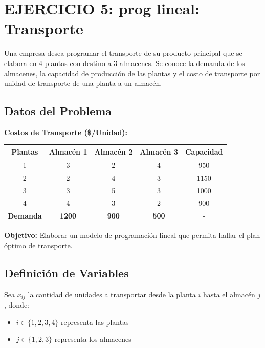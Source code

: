 \documentclass[12pt, a4paper, oneside]{book}
\theoremstyle{definition}
\begin{document}
    \newpage
    \section{EJERCICIO 5: prog lineal: Transporte}

    Una empresa desea programar el transporte de su producto principal que se elabora en 4 plantas con destino a 3 almacenes. Se conoce la demanda de los almacenes, la capacidad de producción de las plantas y el costo de transporte por unidad de transporte de una planta a un almacén.

    \subsection{Datos del Problema}

    \textbf{Costos de Transporte (\$/Unidad):}

    \begin{center}
    \begin{tabular}{|c|c|c|c|c|}
    \hline
    \textbf{Plantas} & \textbf{Almacén 1} & \textbf{Almacén 2} & \textbf{Almacén 3} & \textbf{Capacidad} \\
    \hline
    1 & 3 & 2 & 4 & 950 \\
    \hline
    2 & 2 & 4 & 3 & 1150 \\
    \hline
    3 & 3 & 5 & 3 & 1000 \\
    \hline
    4 & 4 & 3 & 2 & 900 \\
    \hline
    \textbf{Demanda} & \textbf{1200} & \textbf{900} & \textbf{500} & - \\
    \hline
    \end{tabular}
    \end{center}

    \textbf{Objetivo:} Elaborar un modelo de programación lineal que permita hallar el plan óptimo de transporte.

    \subsection{Definición de Variables}

    Sea $x_{ij}$ la cantidad de unidades a transportar desde la planta $i$ hasta el almacén $j$, donde:
    \begin{itemize}
        \item $i \in \{1, 2, 3, 4\}$ representa las plantas
        \item $j \in \{1, 2, 3\}$ representa los almacenes
    \end{itemize}
\end{document}
